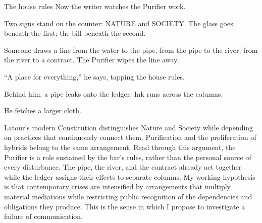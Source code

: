 \begin{ato}{The house rules}
Now the writer watches the Purifier work.

Two signs stand on the counter: NATURE and SOCIETY. The glass goes beneath
the first; the bill beneath the second.

Someone draws a line from the water to the pipe, from the pipe to the
river, from the river to a contract. The Purifier wipes the line away.

“A place for everything,” he says, tapping the house rules.

Behind him, a pipe leaks onto the ledger. Ink runs across the columns.

He fetches a larger cloth.
\end{ato}

Latour's modern Constitution distinguishes Nature and Society while
depending on practices that continuously connect them. Purification and
the proliferation of hybrids belong to the same arrangement.
Read through this argument, the Purifier is a role sustained by the
bar's rules, rather than the personal source of every disturbance.
The pipe, the river, and the contract already act together while the
ledger assigns their effects to separate columns. My working hypothesis
is that contemporary crises are intensified by arrangements that multiply
material mediations while restricting public recognition of the
dependencies and obligations they produce. This is the sense in which
I propose to investigate a failure of communication.

